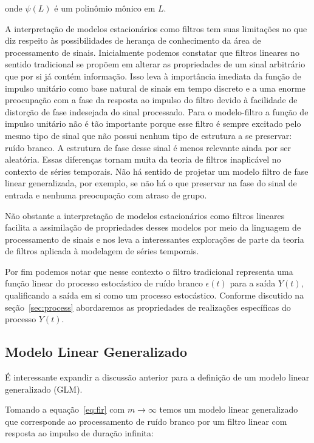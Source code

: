 onde $\psi(L)$ é um polinômio mônico em $L$.

A interpretação de modelos estacionários como filtros tem suas limitações no
que diz respeito às possibilidades de herança de conhecimento da área de
processamento de sinais. Inicialmente podemos constatar que filtros lineares no
sentido tradicional se propõem em alterar as propriedades de um sinal
arbitrário que por si já contém informação. Isso leva à importância imediata da
função de impulso unitário como base natural de sinais em tempo discreto e a
uma enorme preocupação com a fase da resposta ao impulso do filtro devido à
facilidade de distorção de fase indesejada do sinal processado. Para o
modelo-filtro a função de impulso unitário não é tão importante porque esse
filtro é sempre excitado pelo mesmo tipo de sinal que não possui nenhum tipo de
estrutura a se preservar: ruído branco. A estrutura de fase desse sinal é menos
relevante ainda por ser aleatória. Essas diferenças tornam muita da teoria de
filtros inaplicável no contexto de séries temporais. Não há sentido de projetar
um modelo filtro de fase linear generalizada, por exemplo, se não há o que
preservar na fase do sinal de entrada e nenhuma preocupação com atraso de grupo.

Não obstante a interpretação de modelos estacionários como filtros lineares
facilita a assimilação de propriedades desses modelos por meio da linguagem de
processamento de sinais e nos leva a interessantes explorações de parte da
teoria de filtros aplicada à modelagem de séries temporais.

Por fim podemos notar que nesse contexto o filtro tradicional representa uma
função linear do processo estocástico de ruído branco ${\epsilon(t)}$ para a
saída ${Y(t)}$, qualificando a saída em si como um processo estocástico.
Conforme discutido na seção~\ref{sec:process} abordaremos as propriedades de
realizações específicas do processo ${Y(t)}$.



\subsection{Modelo Linear Generalizado}
\label{sec:glm}

É interessante expandir a discussão anterior para a definição de um modelo
linear generalizado (GLM).

Tomando a equação~\ref{eq:fir} com $m \rightarrow \infty$ temos um modelo linear
generalizado que corresponde ao processamento de ruído branco por um filtro
linear com resposta ao impulso de duração infinita:

